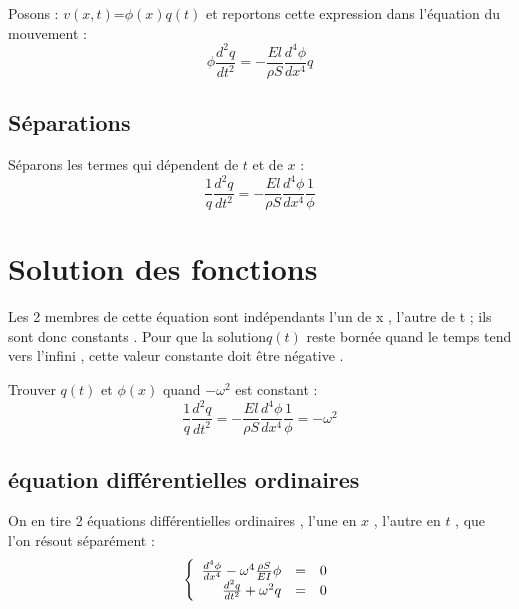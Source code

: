 \documentclass[a4paper,10pt]{report} %
\begin{document}
Posons : $v(x,t)$=$\phi(x)q(t)$ et reportons cette expression dans l'équation du mouvement :
\begin{equation}
	\phi\frac{d^2{q}}{d{t}^2}=-\frac{El}{\rho S}\frac{d^4{\phi}}{d{x}^4}q
	\label{equantion2}
\end{equation}


\subsection{Séparations}
Séparons les termes qui dépendent de $t$ et de $x$ :
\begin{equation}
    \frac{1}{q}\frac{d^2{q}}{d{t}^2}=-\frac{El}{\rho S}\frac{d^4{\phi}}{d{x}^4}\frac{1}{\phi}
    \label{equantion3}
\end{equation}

\section{Solution des fonctions}

Les 2 membres de cette équation sont indépendants l'un de x , l'autre de t ; ils sont donc constants . Pour que la solution$q(t)$ reste bornée quand le temps tend vers l'infini , cette valeur constante doit être négative .
\begin{center}
Trouver $q(t)$ et $\phi(x)$ quand $-\omega^2$ est constant :
	\begin{equation}
		\frac{1}{q}\frac{d^2{q}}{d{t}^2}=-\frac{El}{\rho S}\frac{d^4{\phi}}{d{x}^4}\frac{1}{\phi}=-\omega^2
		\label{equation4}
	\end{equation}
\end{center}


\subsection{équation différentielles ordinaires}

On en tire 2 équations différentielles ordinaires , l'une en $x$ , l'autre en $t$ , que l'on résout séparément :
\begin{equation}
	\left\{
    \begin{array}{r c l }
        \frac{d^4\phi}{dx^4}-\omega^4\frac{\rho S}{EI}\phi&=&0\\
        \frac{d^2q}{dt^2}+\omega^2 q&=&0
    \end{array}
    \right.
\end{equation}
\end{document}
